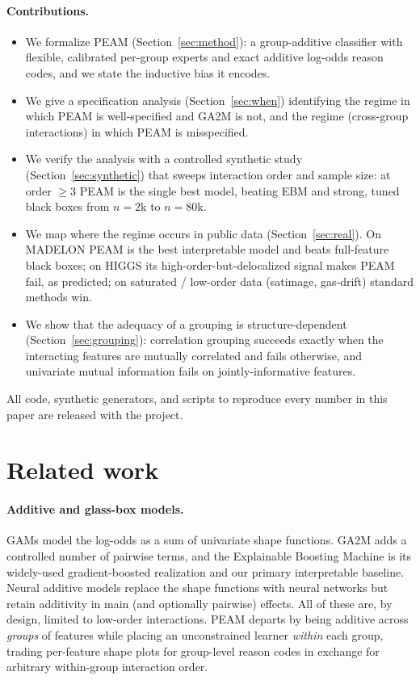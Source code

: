 \documentclass{article}
\begin{document}
\paragraph{Contributions.}
\begin{itemize}
\item We formalize PEAM (Section~\ref{sec:method}): a group-additive classifier
with flexible, calibrated per-group experts and exact additive log-odds reason
codes, and we state the inductive bias it encodes.
\item We give a specification analysis (Section~\ref{sec:when}) identifying the
regime in which PEAM is well-specified and GA2M is not, and the regime
(cross-group interactions) in which PEAM is misspecified.
\item We verify the analysis with a controlled synthetic study
(Section~\ref{sec:synthetic}) that sweeps interaction order and sample size: at
order $\geq 3$ PEAM is the single best model, beating EBM and strong, tuned
black boxes from $n{=}2$k to $n{=}80$k.
\item We map where the regime occurs in public data
(Section~\ref{sec:real}). On MADELON \citep{guyon2003madelon} PEAM is the best
interpretable model and beats full-feature black boxes; on HIGGS
\citep{baldi2014higgs} its high-order-but-delocalized signal makes PEAM fail, as
predicted; on saturated / low-order data (satimage, gas-drift) standard methods
win.
\item We show that the adequacy of a grouping is structure-dependent
(Section~\ref{sec:grouping}): correlation grouping succeeds exactly when the
interacting features are mutually correlated and fails otherwise, and univariate
mutual information fails on jointly-informative features.
\end{itemize}

All code, synthetic generators, and scripts to reproduce every number in this
paper are released with the project.

\section{Related work}

\paragraph{Additive and glass-box models.} GAMs \citep{hastie1990gam} model the
log-odds as a sum of univariate shape functions. GA2M \citep{lou2013ga2m} adds a
controlled number of pairwise terms, and the Explainable Boosting Machine
\citep{caruana2015intelligible,nori2019interpretml} is its widely-used
gradient-boosted realization and our primary interpretable baseline. Neural
additive models \citep{agarwal2021nam} replace the shape functions with neural
networks but retain additivity in main (and optionally pairwise) effects. All of
these are, by design, limited to low-order interactions. PEAM departs by being
additive across \emph{groups} of features while placing an unconstrained learner
\emph{within} each group, trading per-feature shape plots for group-level reason
codes in exchange for arbitrary within-group interaction order.
\end{document}
